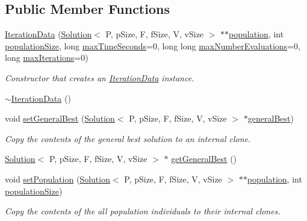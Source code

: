 \subsection*{Public Member Functions}
\begin{DoxyCompactItemize}
\item 
\hyperlink{structIterationData_a7e10e80f912a2b18a17fd176c16bf2f9}{Iteration\+Data} (\hyperlink{classSolution}{Solution}$<$ P, p\+Size, F, f\+Size, V, v\+Size $>$ $\ast$$\ast$\hyperlink{structIterationData_a1f3b9d4dd52556507d2ec1a11c2ce6c4}{population}, int \hyperlink{structIterationData_a8bd76977404cbdfc9ab671c566aed418}{population\+Size}, long \hyperlink{structIterationData_ad10e22f3597e2ac59de07a3d60ed4eb6}{max\+Time\+Seconds}=0, long long \hyperlink{structIterationData_a0c2c484b02710ac2e48221114e027dc6}{max\+Number\+Evaluations}=0, long \hyperlink{structIterationData_a9baa0b37d2e5b38e5e82d3c6fc8dcacf}{max\+Iterations}=0)
\begin{DoxyCompactList}\small\item\em Constructor that creates an \hyperlink{structIterationData}{Iteration\+Data} instance. \end{DoxyCompactList}\item 
\hyperlink{structIterationData_a40b76a1d7cdd3c2a9c7e149ad361d51f}{$\sim$\+Iteration\+Data} ()
\item 
void \hyperlink{structIterationData_a88c3571863098a65b89cbb22817607f3}{set\+General\+Best} (\hyperlink{classSolution}{Solution}$<$ P, p\+Size, F, f\+Size, V, v\+Size $>$ $\ast$\hyperlink{structIterationData_a537b9ef402a8f1f5a0e7f017e698e61b}{general\+Best})
\begin{DoxyCompactList}\small\item\em Copy the contents of the general best solution to an internal clone. \end{DoxyCompactList}\item 
\hyperlink{classSolution}{Solution}$<$ P, p\+Size, F, f\+Size, V, v\+Size $>$ $\ast$ \hyperlink{structIterationData_a52a85ebea1211c365fce026d083feccb}{get\+General\+Best} ()
\item 
void \hyperlink{structIterationData_a891c2a7e6d8f1134dece070ecab16afd}{set\+Population} (\hyperlink{classSolution}{Solution}$<$ P, p\+Size, F, f\+Size, V, v\+Size $>$ $\ast$$\ast$\hyperlink{structIterationData_a1f3b9d4dd52556507d2ec1a11c2ce6c4}{population}, int \hyperlink{structIterationData_a8bd76977404cbdfc9ab671c566aed418}{population\+Size})
\begin{DoxyCompactList}\small\item\em Copy the contents of the all population individuals to their internal clones. \end{DoxyCompactList}\item 

\end{DoxyCompactItemize}

